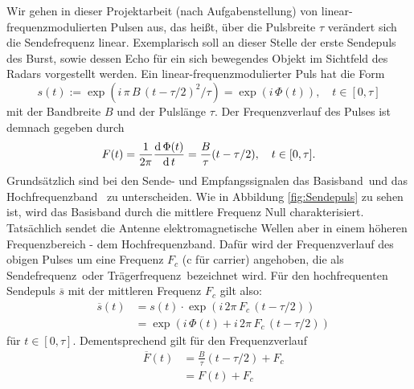 Wir gehen in dieser Projektarbeit (nach Aufgabenstellung) von linear-fre\-quenz\-mo\-du\-lier\-ten Pulsen aus, das heißt, über die Pulsbreite $ \tau $ verändert sich die Sendefrequenz linear. Exemplarisch soll an dieser Stelle der erste Sendepuls des Burst, sowie dessen Echo für ein sich bewegendes Objekt im Sichtfeld des Radars vorgestellt werden. Ein linear-fre\-quenz\-mo\-du\-lier\-ter Puls hat die Form
% 
\begin{equation}
  s(t) := \exp\left( i \, \pi \, B \, (t - \tau/2)^{2}/{\tau} \right) 
        = \exp\left( i \, \Phi(t) \right), \quad t \in [0, \tau] 
\end{equation}
%
mit der Bandbreite \(B\) und der Pulslänge \(\tau\). Der Frequenzverlauf des Pulses ist demnach gegeben durch
%
\begin{equation}
  F(t) = \frac{1}{2\pi}\frac{\operatorname{d} \Phi(t)}{\operatorname{d} t} = \frac{B}{\tau}(t-\tau/2), \quad t \in [0, \tau] \text{.}
\end{equation}
% 
%
%
%
%
Grundsätzlich sind bei den Sende- und Empfangssignalen das \glqq Basisband\grqq ~und das \glqq Hochfrequenzband \grqq ~zu unterscheiden. Wie in Abbildung \ref{fig:Sendepuls} zu sehen ist, wird das Basisband durch die mittlere Frequenz Null charakterisiert. Tatsächlich sendet die Antenne elektromagnetische Wellen aber in einem höheren Frequenzbereich - dem Hochfrequenzband. Dafür wird der Frequenzverlauf des obigen Pulses um eine Frequenz $F_{c}$ (c für \glqq carrier\grqq) angehoben, die als \glqq Sendefrequenz\grqq ~oder \glqq Trägerfrequenz\grqq ~bezeichnet wird. Für den hochfrequenten Sendepuls $\overline{s}$ mit der mittleren Frequenz $F_{c}$ gilt also:
%
\begin{eqnarray}
& \overline{s}(t) &= s(t)\cdot  \exp\left( i \, 2 \pi \, F_{c} \, (t - \tau/2) \right) \\
& &= \exp\left( i \, \Phi(t) + i \, 2 \pi \, F_{c} \, (t - \tau/2) \right) 
\end{eqnarray}
%
für $ t \in [0, \tau] $. Dementsprechend gilt für den Frequenzverlauf
%
\begin{eqnarray}
& \overline{F}(t) &= \frac{B}{\tau}(t-\tau/2) + F_{c} \\
& &= F(t) + F_{c}
\end{eqnarray}
